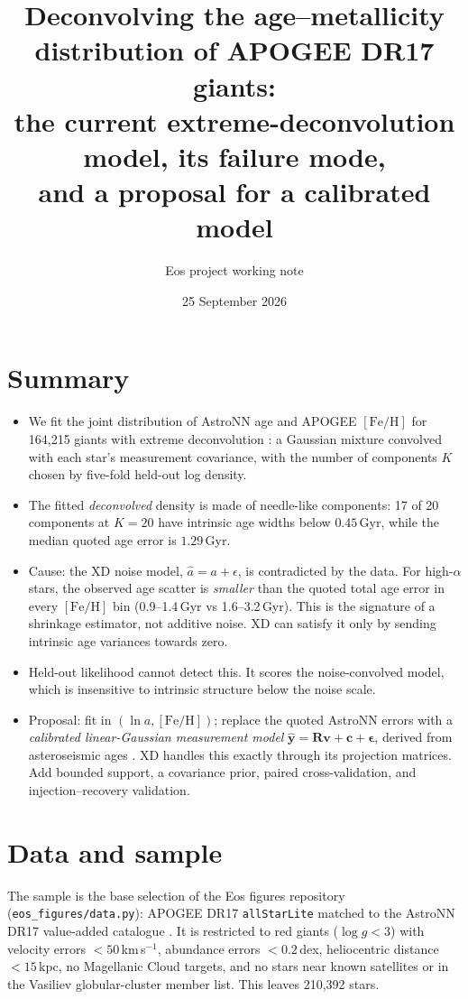 \documentclass[11pt,a4paper]{article}
\title{Deconvolving the age--metallicity distribution of APOGEE DR17 giants:\\
the current extreme-deconvolution model, its failure mode,\\ and a proposal for a calibrated model}
\author{Eos project working note}
\date{25 September 2026}
\newcommand{\feh}{\ensuremath{[\mathrm{Fe/H}]}}
\begin{document}
\maketitle

\section*{Summary}
\begin{itemize}
  \item We fit the joint distribution of AstroNN age and APOGEE \feh{} for 164{,}215 giants with extreme deconvolution \citep[XD;][]{Bovy2011}: a Gaussian mixture convolved with each star's measurement covariance, with the number of components $K$ chosen by five-fold held-out log density.
  \item The fitted \emph{deconvolved} density is made of needle-like components: 17 of 20 components at $K=20$ have intrinsic age widths below $0.45$\,Gyr, while the median quoted age error is $1.29$\,Gyr.
  \item Cause: the XD noise model, $\hat a = a + \epsilon$, is contradicted by the data. For high-$\alpha$ stars, the observed age scatter is \emph{smaller} than the quoted total age error in every \feh{} bin (0.9--1.4\,Gyr vs 1.6--3.2\,Gyr). This is the signature of a shrinkage estimator, not additive noise. XD can satisfy it only by sending intrinsic age variances towards zero.
  \item Held-out likelihood cannot detect this. It scores the noise-convolved model, which is insensitive to intrinsic structure below the noise scale.
  \item Proposal: fit in $(\ln a, \feh)$; replace the quoted AstroNN errors with a \emph{calibrated linear-Gaussian measurement model} $\hat{\bm y} = \mathbf{R}\bm v + \bm c + \bm\epsilon$, derived from asteroseismic ages \citep[APOKASC-3;][]{Pinsonneault2025}. XD handles this exactly through its projection matrices. Add bounded support, a covariance prior, paired cross-validation, and injection--recovery validation.
\end{itemize}

\section{Data and sample}
\label{sec:data}
The sample is the base selection of the Eos figures repository (\texttt{eos\_figures/data.py}): APOGEE DR17 \texttt{allStarLite} \citep{DR17} matched to the AstroNN DR17 value-added catalogue \citep{Leung2019,Mackereth2019}. It is restricted to red giants ($\log g<3$) with velocity errors $<50$\,km\,s$^{-1}$, abundance errors $<0.2$\,dex, heliocentric distance $<15$\,kpc, no Magellanic Cloud targets, and no stars near known satellites or in the Vasiliev globular-cluster member list. This leaves 210{,}392 stars.
\end{document}
